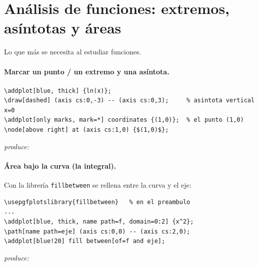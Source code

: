 \documentclass[11pt,a4paper]{article}
\newcommand{\produce}{\par\smallskip\noindent\textit{produce:}\par\smallskip}
\begin{document}
\section{Análisis de funciones: extremos, asíntotas y áreas}
Lo que más se necesita al estudiar funciones.

\paragraph{Marcar un punto / un extremo y una asíntota.}
\begin{lstlisting}
\addplot[blue, thick] {ln(x)};
\draw[dashed] (axis cs:0,-3) -- (axis cs:0,3);     % asintota vertical x=0
\addplot[only marks, mark=*] coordinates {(1,0)};  % el punto (1,0)
\node[above right] at (axis cs:1,0) {$(1,0)$};
\end{lstlisting}
\produce
\begin{center}
\end{center}

\paragraph{Área bajo la curva (la integral).} Con la librería \texttt{fillbetween}
se rellena entre la curva y el eje:
\begin{lstlisting}
\usepgfplotslibrary{fillbetween}   % en el preambulo
...
\addplot[blue, thick, name path=f, domain=0:2] {x^2};
\path[name path=eje] (axis cs:0,0) -- (axis cs:2,0);
\addplot[blue!20] fill between[of=f and eje];
\end{lstlisting}
\produce
\begin{center}
\end{center}
\end{document}
